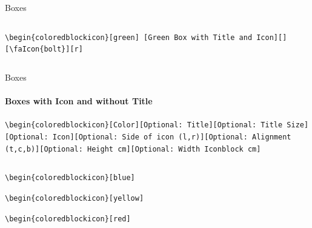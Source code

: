 \documentclass[aspectratio=169]{beamer}
\begin{document}
\begin{frame}{Boxes}
\begin{columns}
\begin{column}{0.49\textwidth}
            \begin{coloredblockicon}
                \footnotesize\texttt{\textbackslash begin\{coloredblockicon\}[green] [Green Box with Title and Icon][][\textbackslash faIcon\{bolt\}][r]}\strut
            \end{coloredblockicon}
        
        \end{column}
    \end{columns}

\end{frame}

\begin{frame}{Boxes}
    \framesubtitle{Boxes with Icon and without Title}

    \begin{coloredblock}[grey]
        \footnotesize\centering\texttt{\textbackslash begin\{coloredblockicon\}[Color][Optional:~Title][Optional:~Title~Size] [Optional:~Icon][Optional:~Side~of~icon (l,r)][Optional:~Alignment (t,c,b)][Optional:~Height~cm][Optional:~Width~Iconblock~cm]}
    \end{coloredblock}
        

    \vspace{-1cm}
    \begin{columns}
        \begin{column}{0.49\textwidth}

            \begin{coloredblockicon}
                \footnotesize\texttt{\textbackslash begin\{coloredblockicon\}[blue]}\strut
            \end{coloredblockicon}
    
            \begin{coloredblockicon}
                \footnotesize\texttt{\textbackslash begin\{coloredblockicon\}[yellow]}\strut
            \end{coloredblockicon}
    
            \begin{coloredblockicon}
                \footnotesize\texttt{\textbackslash begin\{coloredblockicon\}[red]}\strut
            \end{coloredblockicon}

        \end{column}
        \begin{column}{0.49\textwidth}
        

\end{column}
\end{columns}
\end{frame}
\end{document}
